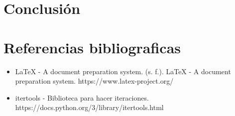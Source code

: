 \documentclass{article}
\begin{document}
\section{Conclusión}


\section{Referencias bibliograficas}
\begin{itemize}
    \item LaTeX - A document preparation system. (s. f.). LaTeX - A document preparation system. https://www.latex-project.org/
    \item itertools - Biblioteca para hacer iteraciones. https://docs.python.org/3/library/itertools.html
\end{itemize}
\end{document}
